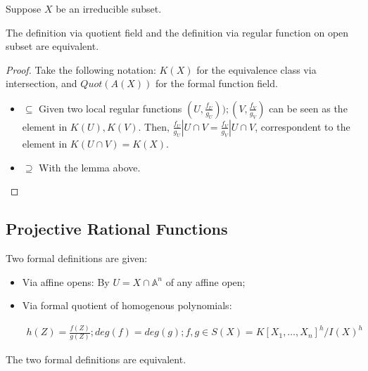\documentclass[Total.tex]{subfiles}
\begin{document}
		\begin{proposition}
			Suppose $X$ be an irreducible subset.
			
			The definition via quotient field and the definition via regular function on open subset are equivalent.
		\end{proposition}
		
		\begin{proof}
			
			Take the following notation: $K(X)$ for the equivalence class via intersection, and $Quot(A(X))$ for the formal function field.
			
			\begin{itemize}
				\item $\subseteq$ Given two local regular functions $(U,\frac{f_U}{g_U}));(V,\frac{f_V}{g_V})$ can be seen as the element in $K(U),K(V)$. Then, $\frac{f_U}{g_U}|U\cap V=\frac{f_V}{g_V}|U\cap V$, correspondent to the element in $K(U\cap V)=K(X)$. 
				\item $\supseteq$ With the lemma above.
			\end{itemize}
		\end{proof}
		
		
		
		
		
		\subsection{Projective Rational Functions}
		
		\begin{Def}
			Two formal definitions are given:
			
			\begin{itemize}
				\item Via affine opens: By $U=X\cap \mathbb{A}^n$ of any affine open;
				
				\item Via formal quotient of homogenous polynomials:
				
				\begin{gather*}
					h(Z)=\frac{f(Z)}{g(Z)};deg(f)=deg(g);f,g\in S(X)=K[X_1,\dots,X_n]^h/I(X)^h
				\end{gather*}
			\end{itemize}
		\end{Def}
		
		\begin{proposition}
			The two formal definitions are equivalent.
		\end{proposition}
		
\end{document}
